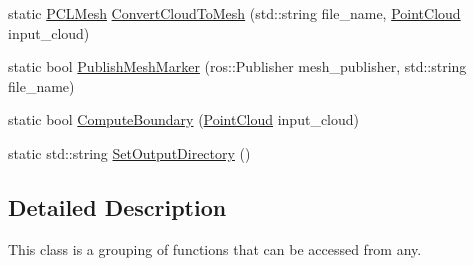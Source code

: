 \begin{DoxyCompactItemize}
static \hyperlink{_helper_functions_8h_a1ee4898d5040989c5fad6726ea5b2056}{\-P\-C\-L\-Mesh} \hyperlink{class_helper_functions_a51d22836259590b5e4e27c551bba93f3}{\-Convert\-Cloud\-To\-Mesh} (std\-::string file\-\_\-name, \hyperlink{_helper_functions_8h_abb956d1047f4dd2c956fe3cb0dd0004d}{\-Point\-Cloud} input\-\_\-cloud)
\item 
static bool \hyperlink{class_helper_functions_a5b355421138212e50b90b120734854ef}{\-Publish\-Mesh\-Marker} (ros\-::\-Publisher mesh\-\_\-publisher, std\-::string file\-\_\-name)
\item 
static bool \hyperlink{class_helper_functions_a7bd069a96e6f6c0ff1f1a8c402324c34}{\-Compute\-Boundary} (\hyperlink{_helper_functions_8h_abb956d1047f4dd2c956fe3cb0dd0004d}{\-Point\-Cloud} input\-\_\-cloud)
\item 
static std\-::string \hyperlink{class_helper_functions_a2ede06a3be39f9c255d3c804109e5a7f}{\-Set\-Output\-Directory} ()
\end{DoxyCompactItemize}


\subsection{\-Detailed \-Description}
\-This class is a grouping of functions that can be accessed from any. 

